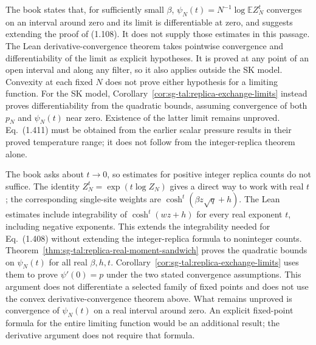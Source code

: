 \begin{remark}\label{rem:sg-tal:replica-convexity-scope}
The book states that, for sufficiently small $\beta$, $\psi_N(t)=N^{-1}\log\mathbb EZ_N^t$
converges on an interval around zero and its limit is differentiable at zero, and suggests
extending the proof of (1.108). It does not supply those estimates in this passage.
The Lean derivative-convergence theorem takes pointwise convergence and differentiability
of the limit as explicit hypotheses. It is proved at any point of an open interval and
along any filter, so it also applies outside the SK model.
Convexity at each fixed $N$ does not prove either hypothesis for a limiting function.
For the SK model, Corollary~\ref{cor:sg-tal:replica-exchange-limits} instead proves
differentiability from the quadratic bounds, assuming convergence of both $p_N$ and
$\psi_N(t)$ near zero. Existence of the latter limit remains unproved.
Eq.~(1.411) must be obtained from the earlier scalar pressure results in their proved
temperature range; it does not follow from the integer-replica theorem alone.
\end{remark}

\begin{remark}\label{rem:sg-tal:replica-next-estimates}
The book asks about $t\to0$, so estimates for positive integer replica counts do not suffice.
The identity $Z_N^t=\exp(t\log Z_N)$ gives a direct way to work with real $t$;
the corresponding single-site weights are $\cosh^t(\beta z\sqrt q+h)$.
The Lean estimates include integrability of $\cosh^t(wz+h)$ for every real exponent $t$,
including negative exponents. This extends the integrability needed for Eq.~(1.408)
without extending the integer-replica formula to noninteger counts.
Theorem~\ref{thm:sg-tal:replica-real-moment-sandwich} proves the quadratic bounds on
$\psi_N(t)$ for all real $\beta,h,t$. Corollary~\ref{cor:sg-tal:replica-exchange-limits}
uses them to prove $\psi'(0)=p$ under the two stated convergence assumptions.
This argument does not differentiate a selected family of fixed points and does not
use the convex derivative-convergence theorem above.
What remains unproved is convergence of $\psi_N(t)$ on a real interval around zero.
An explicit fixed-point formula for the entire limiting function would be an additional
result; the derivative argument does not require that formula.
\end{remark}

